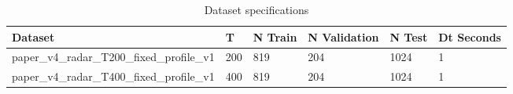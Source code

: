 \begin{table}[t]
\centering
\caption{Dataset specifications}
\label{tab:datasets}
\begin{tabular}{llllll}
\hline
Dataset & T & N Train & N Validation & N Test & Dt Seconds \\
\hline
paper\_v4\_radar\_T200\_fixed\_profile\_v1 & 200 & 819 & 204 & 1024 & 1 \\
paper\_v4\_radar\_T400\_fixed\_profile\_v1 & 400 & 819 & 204 & 1024 & 1 \\
\hline
\end{tabular}
\end{table}
